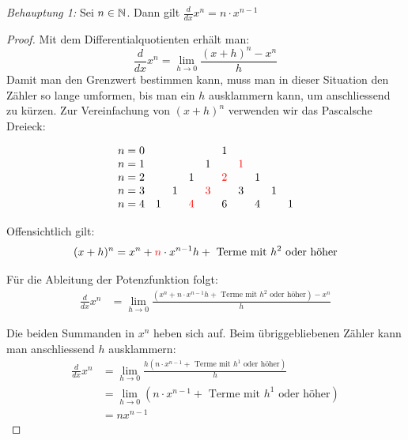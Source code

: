 \emph{Behauptung 1:} Sei $n\in \mathbb{N}$. Dann gilt
$\frac{d}{dx} x^n = n\cdot x^{n-1}$
\begin{proof}
	Mit dem Differentialquotienten erhält man:
	$$\frac{d}{dx} x^n=\lim_{h\rightarrow0}\frac{(x+h)^n-x^n}{h}$$
	Damit man den Grenzwert bestimmen kann, muss man in dieser Situation den Zähler so lange umformen, bis man ein $h$ ausklammern kann, um anschliessend zu kürzen. Zur Vereinfachung von $(x+h)^n$ verwenden wir das Pascalsche Dreieck:

	\[
		\begin{array}{lccccccccc}
			n=0 &   &   &                    &                    & 1                  &                    &   &   &   \\
			n=1 &   &   &                    & 1                  &                    & \textcolor{red}{1} &   &   &   \\
			n=2 &   &   & 1                  &                    & \textcolor{red}{2} &                    & 1 &   &   \\
			n=3 &   & 1 &                    & \textcolor{red}{3} &                    & 3                  &   & 1 &   \\
			n=4 & 1 &   & \textcolor{red}{4} &                    & 6                  &                    & 4 &   & 1
		\end{array}
	\]

	Offensichtlich gilt:
	$$(x+h)^n = x^n + \textcolor{red}{n}\cdot x^{n-1}h + \text { Terme mit } h^2 \text{ oder höher}$$



	Für die Ableitung der Potenzfunktion folgt:
	\begin{align*}
		\frac{d}{dx} x^n & = \lim_{h\rightarrow 0}\frac{\left( x^n + n\cdot x^{n-1}h + \text { Terme mit } h^2 \text{ oder höher} \right)- x^n}{h}
	\end{align*}

	Die beiden Summanden in $x^n$ heben sich auf. Beim übriggebliebenen Zähler kann man anschliessend $h$ ausklammern:
	\begin{align*}
		\frac{d}{dx} x^n & = \lim_{h\rightarrow 0} \frac{h \left(n\cdot x^{n-1} + \text { Terme mit } h^1 \text{ oder höher} \right)}{h} \\
		                 & = \lim_{h\rightarrow 0} \left(n\cdot x^{n-1} + \text { Terme mit } h^1 \text{ oder höher}  \right)            \\
		                 & = n x^{n-1}
	\end{align*}







\end{proof}
